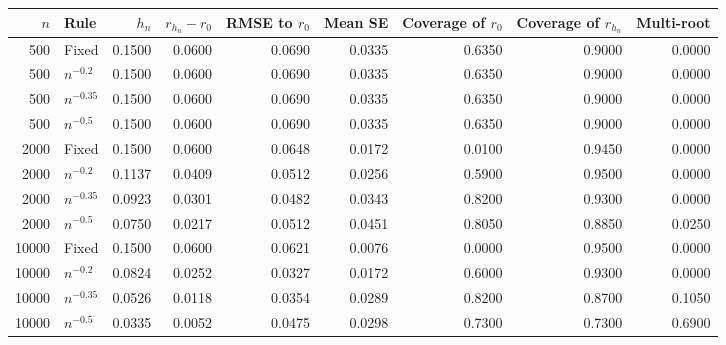 \begin{tabular}{rlrrrrrrr}
\toprule
$n$ & Rule & $h_n$ & $r_{h_n}-r_0$ & RMSE to $r_0$ & Mean SE & Coverage of $r_0$ & Coverage of $r_{h_n}$ & Multi-root \\
\midrule
500 & Fixed & 0.1500 & 0.0600 & 0.0690 & 0.0335 & 0.6350 & 0.9000 & 0.0000 \\
500 & $n^{-0.2}$ & 0.1500 & 0.0600 & 0.0690 & 0.0335 & 0.6350 & 0.9000 & 0.0000 \\
500 & $n^{-0.35}$ & 0.1500 & 0.0600 & 0.0690 & 0.0335 & 0.6350 & 0.9000 & 0.0000 \\
500 & $n^{-0.5}$ & 0.1500 & 0.0600 & 0.0690 & 0.0335 & 0.6350 & 0.9000 & 0.0000 \\
2000 & Fixed & 0.1500 & 0.0600 & 0.0648 & 0.0172 & 0.0100 & 0.9450 & 0.0000 \\
2000 & $n^{-0.2}$ & 0.1137 & 0.0409 & 0.0512 & 0.0256 & 0.5900 & 0.9500 & 0.0000 \\
2000 & $n^{-0.35}$ & 0.0923 & 0.0301 & 0.0482 & 0.0343 & 0.8200 & 0.9300 & 0.0000 \\
2000 & $n^{-0.5}$ & 0.0750 & 0.0217 & 0.0512 & 0.0451 & 0.8050 & 0.8850 & 0.0250 \\
10000 & Fixed & 0.1500 & 0.0600 & 0.0621 & 0.0076 & 0.0000 & 0.9500 & 0.0000 \\
10000 & $n^{-0.2}$ & 0.0824 & 0.0252 & 0.0327 & 0.0172 & 0.6000 & 0.9300 & 0.0000 \\
10000 & $n^{-0.35}$ & 0.0526 & 0.0118 & 0.0354 & 0.0289 & 0.8200 & 0.8700 & 0.1050 \\
10000 & $n^{-0.5}$ & 0.0335 & 0.0052 & 0.0475 & 0.0298 & 0.7300 & 0.7300 & 0.6900 \\
\bottomrule
\end{tabular}
